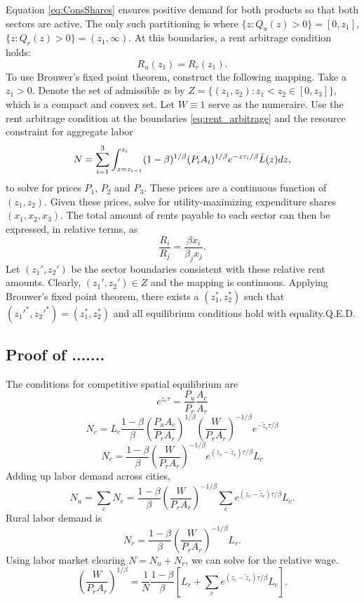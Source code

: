 \documentclass[12pt]{article}
\begin{document}
Equation \eqref{eq:ConsShares} ensures positive demand for both products so that both sectors are active. The only such partitioning is where $\{z: Q_u(z)>0\} = [0,z_1]$, $\{z: Q_r(z)>0\} = (z_1,\infty)$. At this boundaries, a rent arbitrage condition holds:
\begin{equation}\label{eq:rent_arbitrage}
	R_u(z_1) = R_{r}(z_1).
\end{equation}
To use Brouwer's fixed point theorem, construct the following mapping. Take a $z_1>0$. Denote the set of admissible $z$s by $Z=\{(z_1,z_2): z_1<z_2 \in [0,z_3]\}$, which is a compact and convex set. 
Let $W\equiv 1$ serve as the numeraire. Use the rent arbitrage condition at the boundaries \eqref{eq:rent_arbitrage} and the resource constraint for aggregate labor
\[
N = \sum_{i=1}^3 \int_{z=z_{i-1}}^{z_i}(1-\beta)^{1/\beta}
	(P_iA_i)^{1/\beta}
	e^{- z \tau_i/\beta}\Bar L(z)dz,
\]
to solve for prices $P_1$, $P_2$ and $P_3$. These prices are a continuous function of $(z_1,z_2)$.
Given these prices, solve for utility-maximizing expenditure shares $(x_1,x_2,x_3)$. The total amount of rents payable to each sector can then be expressed, in relative terms, as
\[
\frac {R_i}
	{R_j}
=
\frac {\beta x_i}
	{\beta_j x_j}.
\]
Let $(z_1',z_2')$ be the sector boundaries consistent with these relative rent amounts. Clearly, $(z_1',z_2')\in Z$ and the mapping is continuous. Applying Brouwer's fixed point theorem, there exists a $(z_1^*,z_2^*)$ such that $(z_1'^{*},z_2'^{*}) = (z_1^*,z_2^*)$ and all equilibrium conditions hold with equality.\hfill Q.E.D.

\subsection{Proof of .......}
The conditions for competitive spatial equilibrium are
\begin{equation}\tag{i}\label{eq:EQ1}
e^{z_{c} \tau} =
\frac{P_u}{P_r}
\frac {A_c}{A_r}
\end{equation}
\[
	N_c = L_c
\frac{1-\beta}{\beta}
	 \left(\frac{P_uA_c}{P_rA_r}\right)^{1/\beta}
	 \left(\frac{W}{P_rA_r}\right)^{-1/\beta}
	 e^{-\tilde z_c{\tau/\beta}}
\]
\[
	N_c = 
\frac{1-\beta}{\beta}
	 \left(\frac{W}{P_rA_r}\right)^{-1/\beta}
	 e^{(z_c-\tilde z_c){\tau/\beta}}L_c
\]
Adding up labor demand across cities,
\[
N_u = \sum_c N_c
=
\frac{1-\beta}{\beta}
	 \left(\frac{W}{P_rA_r}\right)^{-1/\beta}
\sum_c e^{(z_c-\tilde z_c){\tau/\beta}}L_c.
\]
Rural labor demand is
\[
N_r =
\frac{1-\beta}{\beta}
	 \left(\frac{W}{P_rA_r}\right)^{-1/\beta}L_r.
\]
Using labor market clearing $N=N_u+N_r$, we can solve for the relative wage.
\[
\left(\frac{W}{P_rA_r}\right)^{1/\beta}
= \frac{1}{N}
	\frac{1-\beta}{\beta}
\left[
	L_r+
	\sum_c e^{(z_c-\tilde z_c){\tau/\beta}}L_c
\right].
\]
\end{document}
